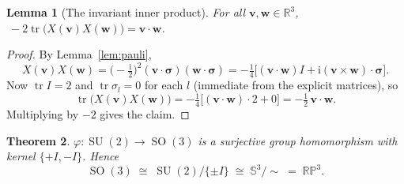 \documentclass[11pt]{article}
\DeclareMathOperator{\tr}{tr}
\DeclareMathOperator{\SO}{SO}
\DeclareMathOperator{\SU}{SU}
\newcommand{\R}{\mathbb{R}}
\newcommand{\Sph}{\mathbb{S}}
\newcommand{\RP}{\mathbb{RP}}
\newcommand{\vv}[1]{\bm{#1}}
\newcommand{\ii}{\mathrm{i}}
\theoremstyle{plain}
\newtheorem{theorem}{Theorem}[section]
\newtheorem{lemma}[theorem]{Lemma}
\theoremstyle{definition}
\begin{document}
\begin{lemma}[The invariant inner product]\label{lem:innerprod}
For all $\vv v,\vv w\in\R^3$, $\ -2\tr\big(X(\vv v)X(\vv w)\big)=\vv v\cdot\vv w$.
\end{lemma}

\begin{proof}
By Lemma~\ref{lem:pauli},
\[
X(\vv v)X(\vv w)=\Big(-\tfrac{\ii}{2}\Big)^{\!2}(\vv v\cdot\vv\sigma)(\vv w\cdot\vv\sigma)
=-\tfrac14\Big[(\vv v\cdot\vv w)I+\ii(\vv v\times\vv w)\cdot\vv\sigma\Big].
\]
Now $\tr I=2$ and $\tr\sigma_l=0$ for each $l$ (immediate from the explicit matrices), so
\[
\tr\big(X(\vv v)X(\vv w)\big)=-\tfrac14\big[(\vv v\cdot\vv w)\cdot 2+0\big]=-\tfrac12\,\vv v\cdot\vv w .
\]
Multiplying by $-2$ gives the claim.
\end{proof}

\begin{theorem}\label{thm:cover}
$\varphi:\SU(2)\to\SO(3)$ is a surjective group homomorphism with kernel $\{+I,-I\}$. Hence
\[
\SO(3)\;\cong\;\SU(2)/\{\pm I\}\;\cong\;\Sph^3/\!\sim\;=\;\RP^3 .
\]
\end{theorem}
\end{document}
